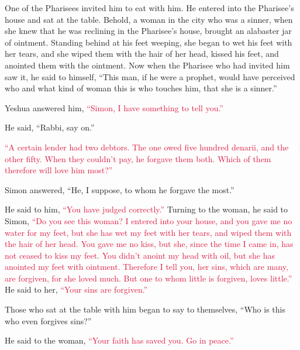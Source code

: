 \myverse{}One of the Pharisees invited him to eat with him. He entered
into the Pharisee’s house and sat at the table.
\myverse{}Behold, a woman in the city who was a sinner, when she knew that he was reclining
in the Pharisee’s house, brought an alabaster jar of ointment.
\myverse{}Standing behind at his feet weeping, she began to wet his feet with her tears,
and she wiped them with the hair of her head, kissed his feet, and anointed them with the ointment.
\myverse{}Now when the Pharisee who had invited him saw it, he said to himself, “This
man, if he were a prophet, would have perceived who and what kind of woman this is who touches him, that
she is a sinner.”

\myverse{}Yeshua answered him,
\textcolor{crimson}{“Simon, I have something to tell you.”
}

He said, “Rabbi, say on.”

\myverse{}\textcolor{crimson}{“A certain lender had two debtors. The one owed five hundred
	denarii, and the other fifty.
}
\myverse{}\textcolor{crimson}{When they couldn’t pay, he forgave them both. Which of them therefore
	will love him most?”}

\myverse{}Simon answered, “He, I suppose, to whom he forgave the most.”

He said to him,
\textcolor{crimson}{“You have judged correctly.”}
\myverse{}Turning to the woman, he said to Simon,
\textcolor{crimson}{“Do you see this woman? I entered into your house, and you gave me no water for my feet, but she has
	wet my feet with her tears, and wiped them with the hair of her head.
}
\myverse{}\textcolor{crimson}{You gave me no kiss, but she, since the time I came in, has not ceased
	to kiss my feet.
}
\myverse{}\textcolor{crimson}{You didn’t anoint my head with oil, but she has anointed my feet with
	ointment.
}
\myverse{}\textcolor{crimson}{Therefore I tell you, her sins, which are many, are forgiven, for she
	loved much. But one to whom little is forgiven, loves little.”
}
\myverse{}He said to her,
\textcolor{crimson}{“Your sins are forgiven.”}

\myverse{}Those who sat at the table with him began to say to themselves,
“Who is this who even forgives sins?”

\myverse{}He said to the woman,
\textcolor{crimson}{“Your faith has saved you. Go in peace.”
}


